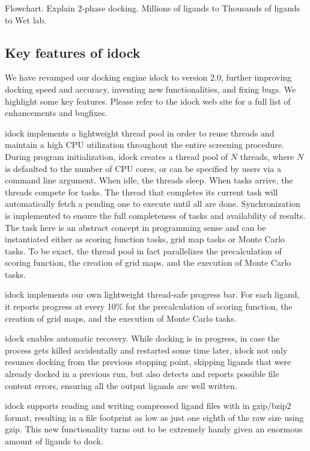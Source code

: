 \documentclass[10pt]{article}
\begin{document}
Flowchart. Explain 2-phase docking. Millions of ligands to Thousands of ligands to Wet lab.

\subsection*{Key features of idock}
We have revamped our docking engine idock to version 2.0, further improving docking speed and accuracy, inventing new functionalities, and fixing bugs. We highlight some key features. Please refer to the idock web site for a full list of enhancements and bugfixes.

idock implements a lightweight thread pool in order to reuse threads and maintain a high CPU utilization throughout the entire screening procedure. During program initialization, idock creates a thread pool of $N$ threads, where $N$ is defaulted to the number of CPU cores, or can be specified by users via a command line argument. When idle, the threads sleep. When tasks arrive, the threads compete for tasks. The thread that completes its current task will automatically fetch a pending one to execute until all are done. Synchronization is implemented to ensure the full completeness of tasks and availability of results. The task here is an abstract concept in programming sense and can be instantiated either as scoring function tasks, grid map tasks or Monte Carlo tasks. To be exact, the thread pool in fact parallelizes the precalculation of scoring function, the creation of grid maps, and the execution of Monte Carlo tasks.

idock implements our own lightweight thread-safe progress bar. For each ligand, it reports progress at every 10\% for the precalculation of scoring function, the creation of grid maps, and the execution of Monte Carlo tasks.

idock enables automatic recovery. While docking is in progress, in case the process gets killed accidentally and restarted some time later, idock not only resumes docking from the previous stopping point, skipping ligands that were already docked in a previous run, but also detects and reports possible file content errors, ensuring all the output ligands are well written.

idock supports reading and writing compressed ligand files with in gzip/bzip2 format, resulting in a file footprint as low as just one eighth of the raw size using gzip. This new functionality turns out to be extremely handy given an enormous amount of ligands to dock.
\end{document}
